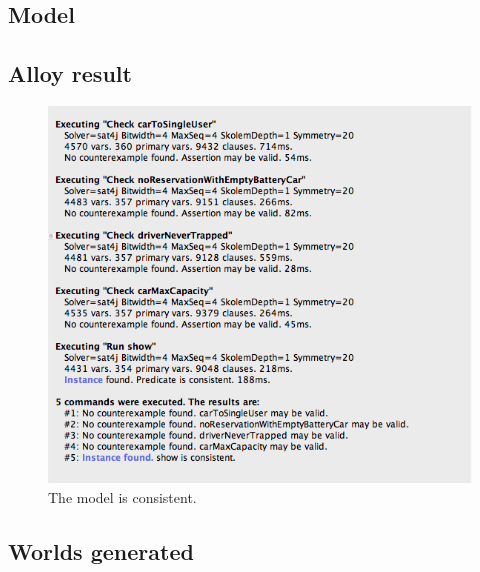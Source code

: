 \subsection{Model}


\subsection{Alloy result}
	\begin{figure}
		\includegraphics[width=\textwidth]{img/alloy_output.png}
		\caption{The model is consistent.}
		\label{figure 1}
	\end{figure}

\subsection{Worlds generated}